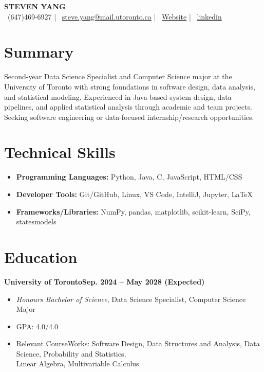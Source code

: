 \documentclass[10.5pt]{article}
\newcommand{\contactsep}{\hspace{10pt}|\hspace{10pt}}
\newcommand{\roleline}[2]{\textbf{#1}\hfill \textbf{#2}}
\begin{document}
\begin{center}
    {\LARGE \textbf{STEVEN YANG}} \\[8pt]
    \faPhone\ (647)469-6927
    \contactsep
    \faEnvelope\ \href{mailto:steve.yang@mail.utoronto.ca}{steve.yang@mail.utoronto.ca}
    \contactsep
    \faGlobe\ \href{https://Sytion06.github.io}{Website}
    \contactsep
    \faLinkedin\ \href{https://www.linkedin.com/in/steven-yang-7760293a3/}{linkedin}
\end{center}

\section*{Summary}
Second-year Data Science Specialist and Computer Science major at the University of Toronto with strong foundations in software design, data analysis, and statistical modeling. Experienced in Java-based system design, data pipelines, and applied statistical analysis through academic and team projects. Seeking software engineering or data-focused internship/research opportunities.

\section*{Technical Skills}
\begin{itemize}
  \item \textbf{Programming Languages:} Python, Java, C, JavaScript, HTML/CSS
  \item \textbf{Developer Tools:} Git/GitHub, Linux, VS Code, IntelliJ, Jupyter, LaTeX
  \item \textbf{Frameworks/Libraries:} NumPy, pandas, matplotlib, scikit-learn, SciPy, statesmodels
\end{itemize}

\section*{Education}
\roleline{University of Toronto}{Sep. 2024 -- May 2028 (Expected)}
\begin{itemize}
  \item \textit{Honours Bachelor of Science}, Data Science Specialist, Computer Science Major
  \item GPA: 4.0/4.0
  \item Relevant CourseWorks: Software Design, Data Structures and Analysis, Data Science, Probability and Statistics, \\ Linear Algebra, Multivariable Calculus
\end{itemize}
\end{document}
